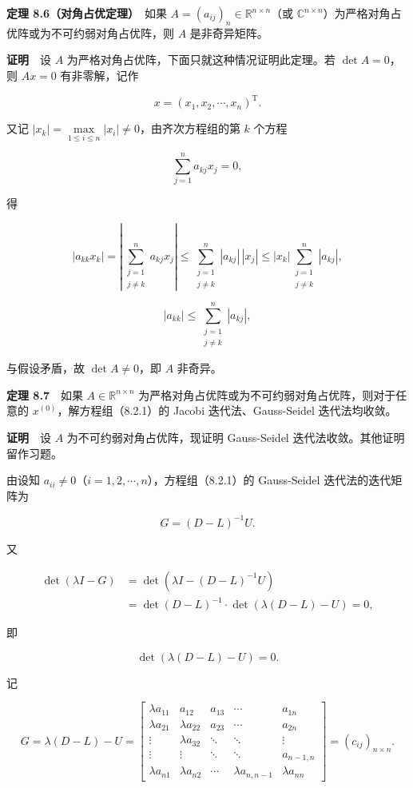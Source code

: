 \documentclass[
  10pt,
  fontset=fandol]{ctexart}
\begin{document}
\textbf{定理 8.6（对角占优定理）}　如果 \(A=(a_{ij})_n\in\mathbb R^{n\times n}\)（或 \(\mathbb C^{n\times n}\)）为严格对角占优阵或为不可约弱对角占优阵，则 \(A\) 是非奇异矩阵。

\textbf{证明}　设 \(A\) 为严格对角占优阵，下面只就这种情况证明此定理。若 \(\det A=0\)，则 \(Ax=0\) 有非零解，记作

\[
x=(x_1,x_2,\cdots,x_n)^{\mathrm T}.
\]

又记 \(|x_k|=\max\limits_{1\leqslant i\leqslant n}|x_i|\neq0\)，由齐次方程组的第 \(k\) 个方程

\[
\sum_{j=1}^n a_{kj}x_j=0,
\]

得

\[
|a_{kk}x_k|=\left|\sum_{\substack{j=1\\j\neq k}}^n a_{kj}x_j\right|
\leqslant\sum_{\substack{j=1\\j\neq k}}^n|a_{kj}|\,|x_j|
\leqslant|x_k|\sum_{\substack{j=1\\j\neq k}}^n|a_{kj}|,
\]

\[
|a_{kk}|\leqslant\sum_{\substack{j=1\\j\neq k}}^n|a_{kj}|,
\tag{8.3.9}
\]

与假设矛盾，故 \(\det A\neq0\)，即 \(A\) 非奇异。

\textbf{定理 8.7}　如果 \(A\in\mathbb R^{n\times n}\) 为严格对角占优阵或为不可约弱对角占优阵，则对于任意的 \(x^{(0)}\)，解方程组（8.2.1）的 Jacobi 迭代法、Gauss-Seidel 迭代法均收敛。

\textbf{证明}　设 \(A\) 为不可约弱对角占优阵，现证明 Gauss-Seidel 迭代法收敛。其他证明留作习题。

由设知 \(a_{ii}\neq0\)（\(i=1,2,\cdots,n\)），方程组（8.2.1）的 Gauss-Seidel 迭代法的迭代矩阵为

\[
G=(D-L)^{-1}U.
\]

又

\[
\begin{aligned}
\det(\lambda I-G)&=\det(\lambda I-(D-L)^{-1}U)\\
&=\det(D-L)^{-1}\cdot\det(\lambda(D-L)-U)=0,
\end{aligned}
\]

即

\[
\det(\lambda(D-L)-U)=0.
\]

记

\[
G=\lambda(D-L)-U=\begin{bmatrix}
\lambda a_{11}&a_{12}&a_{13}&\cdots&a_{1n}\\
\lambda a_{21}&\lambda a_{22}&a_{23}&\cdots&a_{2n}\\
\vdots&\lambda a_{32}&\ddots&\ddots&\vdots\\
\vdots&\vdots&\ddots&\ddots&a_{n-1,n}\\
\lambda a_{n1}&\lambda a_{n2}&\cdots&\lambda a_{n,n-1}&\lambda a_{nn}
\end{bmatrix}=(c_{ij})_{n\times n}.
\]
\end{document}
